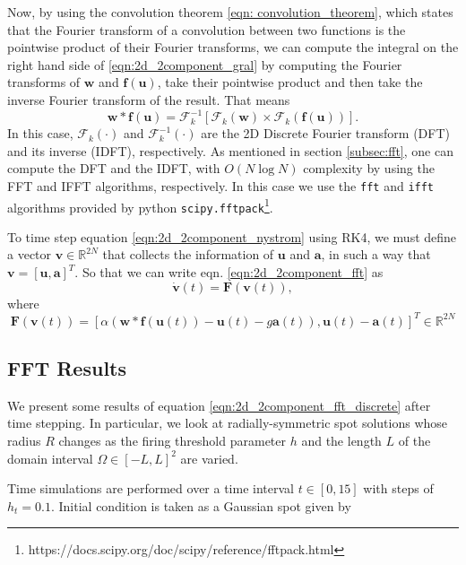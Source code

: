\documentclass{uonmathreport}
\begin{document}
Now, by using the convolution theorem \ref{eqn: convolution_theorem}, which states that the Fourier transform of a convolution between two functions is the pointwise product of their Fourier transforms, we can compute the integral on the right hand side of \ref{eqn:2d_2component_gral} by computing the Fourier transforms of $\textbf{w}$ and $\textbf{f}(\textbf{u})$, take their pointwise product and then take the inverse Fourier transform of the result. That means
\begin{equation}
 \textbf{w} * \textbf{f}(\textbf{u}) = \mathcal{F}^{-1}_k[\mathcal{F}_k(\textbf{w}) \times \mathcal{F}_k(\textbf{f}(\textbf{u}))].
\end{equation}
In this case, $\mathcal{F}_k(\cdot)$ and $\mathcal{F}^{-1}_k(\cdot)$ are the 2D Discrete Fourier transform (DFT) and its inverse (IDFT), respectively. As mentioned in section \ref{subsec:fft}, one can compute the DFT and the IDFT, with $O(N\log N)$ complexity by using the FFT and IFFT algorithms, respectively. In this case we use the \texttt{fft} and \texttt{ifft} algorithms provided by python \texttt{scipy.fftpack}\footnote{https://docs.scipy.org/doc/scipy/reference/fftpack.html}.

To time step equation \ref{eqn:2d_2component_nystrom} using RK4, we must define a vector $\textbf{v}\in \mathbb{R}^{2N} $ that collects the information of $\textbf{u}$ and $\textbf{a}$, in such a way that $\textbf{v} = [\textbf{u}, \textbf{a}]^T$. So that we can write eqn. \ref{eqn:2d_2component_fft} as
\begin{equation}
\dot{\textbf{v}}(t) = \textbf{F}(\textbf{v}(t)),
\end{equation}
where
\begin{equation}
\textbf{F}(\textbf{v}(t)) = [\alpha(\textbf{w}*\textbf{f}(\textbf{u}(t)) -\textbf{u}(t)-g\textbf{a}(t)), \textbf{u}(t) - \textbf{a}(t)]^T \in \mathbb{R}^{2N}
\end{equation}

\subsection{FFT Results} \label{subsec:adaptation_fft_results}
We present some results of equation \ref{eqn:2d_2component_fft_discrete} after time stepping. In particular, we look at radially-symmetric spot solutions whose radius $R$ changes as the firing threshold parameter $h$ and the length $L$ of the domain interval $\Omega \in [-L, L]^2$ are varied.   

Time simulations are performed over a time interval $t \in [0, 15]$ with steps of $h_t= 0.1$. Initial condition is taken as a Gaussian spot given by
\end{document}
